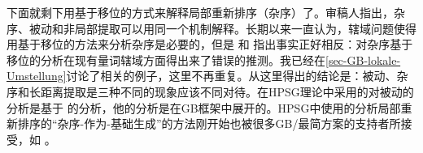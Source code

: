 
下面就剩下用基于移位的方式来解释局部重新排序（杂序）了。审稿人指出，杂序、被动和非局部提取可以用同一个机制解释。长期以来一直认为，辖域问题使得用基于移位的方法来分析杂序是必要的，但是 和 指出事实正好相反：对杂序基于移位的分析在现有量词辖域方面得出来了错误的推测。我已经在\ref{sec-GB-lokale-Umstellung}讨论了相关的例子，这里不再重复。从这里得出的结论是：被动、杂序和长距离提取是三种不同的现象应该不同对待。在HPSG理论中采用的对被动的分析是基于 \citet{Haider86}的分析，他的分析是在GB框架中展开的。HPSG中使用的分析局部重新排序的“杂序-作为-基础生成”的方法刚开始也被很多GB/最简方案的支持者所接受，如 \citet{Fanselow2001a}。


